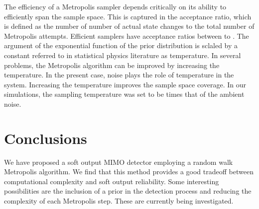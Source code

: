\documentclass[pre,12pt,aps]{revtex4}
\begin{document}
The efficiency of a Metropolis sampler depends 
critically on its ability to efficiently span 
the sample space. This is captured in the 
acceptance ratio, which is defined as the 
number of number of actual state changes to 
the total number of Metropolis attempts. 
Efficient samplers have acceptance ratios 
between  to  . 
The argument of the exponential function 
of the prior distribution is sclaled by 
a constant referred to in statistical physics literature as
temperature. 
In several problems, the Metropolis algorithm can 
be improved by increasing the temperature. 
In 
the present case, noise plays the role of 
temperature in the system. Increasing the 
temperature improves the sample space coverage. 
In our simulations, the sampling 
temperature was set to be  times that of 
the ambient noise. 


\section{Conclusions}
We have proposed a soft output MIMO detector employing 
a random walk Metropolis algorithm. We find that this method
provides a good tradeoff between computational complexity 
and soft output reliability. Some interesting 
possibilities are the inclusion of a prior in the 
detection process and reducing the complexity of 
each Metropolis step. These are currently being 
investigated.
\end{document}
